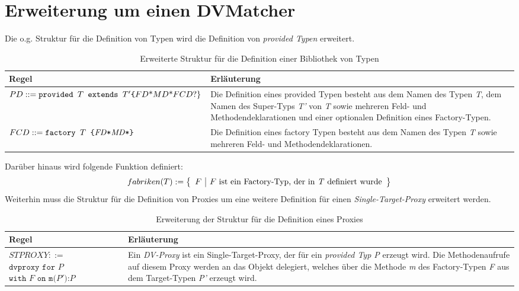 \documentclass[a4paper,12pt]{article}
\begin{document}
\section{Erweiterung um einen DVMatcher}
Die o.g. Struktur für die Definition von Typen wird die Definition von \emph{provided Typen} erweitert.
\begin{table}[H]
\centering
\begin{tabular}{|p{6cm}|p{8cm}|}
\hline
\hline
\centering\textbf{Regel} & \textbf{Erläuterung} \\
\hline
\hline
$PD ::= \newline \texttt{provided } T \texttt{ extends }T' \newline \texttt{\{}FD\text{*} MD\text{*} FCD\text{?\}}$& Die Definition eines provided Typen besteht aus dem Namen des Typen \emph{T}, dem Namen des Super-Typs \emph{T'} von \emph{T} sowie mehreren Feld- und Methodendeklarationen und einer optionalen Definition eines Factory-Typen.\\
\hline
$FCD ::= \texttt{factory }T \texttt{ \{}\newline \mathit{FD}\texttt{*} \mathit{MD}\texttt{*} \texttt{\}} $& Die Definition eines factory Typen besteht aus dem Namen des Typen \emph{T} sowie mehreren Feld- und Methodendeklarationen.\\
\hline
\hline
\end{tabular}
\caption{Erweiterte Struktur für die Definition einer Bibliothek von Typen}
 \label{tab:extTDv}
\end{table}
\noindent
Darüber hinaus wird folgende Funktion definiert:
\begin{gather*}
fabriken(T) :=  \left\{ 
				\begin{array}{l|l}
					F & F \text{ ist ein Factory-Typ, der in \emph{T} definiert wurde}
				\end{array}
              \right\}
\end{gather*}
Weiterhin muss die Struktur für die Definition von Proxies um eine weitere Definition für einen \emph{Single-Target-Proxy} erweitert werden.
\begin{table}[H]
\centering
\begin{tabular}{|p{6cm}|p{8cm}|}
\hline
\centering\textbf{Regel} & \textbf{Erläuterung} \\
\hline
\hline
$\mathit{STPROXY} ::=$\newline 
$\texttt{dvproxy }  \texttt{for } P$\newline
$\texttt{with } F \texttt{ on } \texttt{m(}\mathit{P'}\texttt{):}\mathit{P}$ & Ein \emph{DV-Proxy} ist ein Single-Target-Proxy, der für ein \emph{provided Typ P} erzeugt wird. Die Methodenaufrufe auf diesem Proxy werden an das Objekt delegiert, welches über die Methode \emph{m} des Factory-Typen \emph{F} aus dem Target-Typen \emph{P'} erzeugt wird.\\
\hline
\hline
\end{tabular}
\caption{Erweiterung der Struktur für die Definition eines Proxies}
 \label{tab:extPDv}
\end{table}
\end{document}
